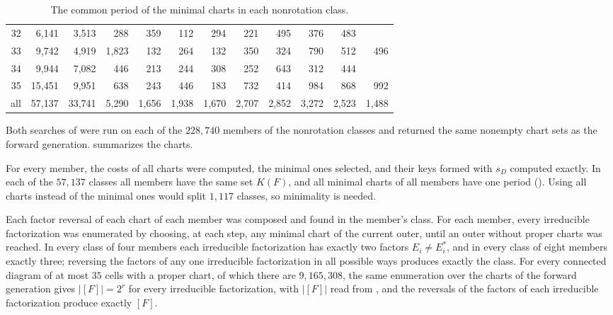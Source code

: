 \documentclass[11pt,a4paper]{amsart}
\numberwithin{equation}{section}
\theoremstyle{plain}
\theoremstyle{definition}
\begin{document}
\begin{table}[ht]
\begin{tabular}{rrrrrrrrrrrr}
32 & 6{,}141 & 3{,}513 & 288 & 359 & 112 & 294 & 221 & 495 & 376 & 483 &  \\
33 & 9{,}742 & 4{,}919 & 1{,}823 & 132 & 264 & 132 & 350 & 324 & 790 & 512 & 496 \\
34 & 9{,}944 & 7{,}082 & 446 & 213 & 244 & 308 & 252 & 643 & 312 & 444 &  \\
35 & 15{,}451 & 9{,}951 & 638 & 243 & 446 & 183 & 732 & 414 & 984 & 868 & 992 \\
\midrule
all & 57{,}137 & 33{,}741 & 5{,}290 & 1{,}656 & 1{,}938 & 1{,}670 & 2{,}707 & 2{,}852 & 3{,}272 & 2{,}523 & 1{,}488 \\
\bottomrule
\end{tabular}
\par\bigskip
\caption{The common period of the minimal charts in each nonrotation class.}
\label{tab:periods}
\end{table}

Both searches of  were run on each of the \(228{,}740\) members of the nonrotation classes and returned the same nonempty chart sets as the forward generation.   summarizes the charts.

For every member, the costs of all charts were computed, the minimal ones selected, and their keys formed with \(s_D\) computed exactly.  In each of the \(57{,}137\) classes all members have the same set \(K(F)\), and all minimal charts of all members have one period ().  Using all charts instead of the minimal ones would split \(1{,}117\) classes, so minimality is needed.

Each factor reversal of each chart of each member was composed and found in the member's class.  For each member, every irreducible factorization was enumerated by choosing, at each step, any minimal chart of the current outer, until an outer without proper charts was reached.  In every class of four members each irreducible factorization has exactly two factors \(E_i\ne E_i^*\), and in every class of eight members exactly three; reversing the factors of any one irreducible factorization in all possible ways produces exactly the class.  For every connected diagram of at most \(35\) cells with a proper chart, of which there are \(9{,}165{,}308\), the same enumeration over the charts of the forward generation gives \(|[F]|=2^r\) for every irreducible factorization, with \(|[F]|\) read from , and the reversals of the factors of each irreducible factorization produce exactly \([F]\).
\end{document}
